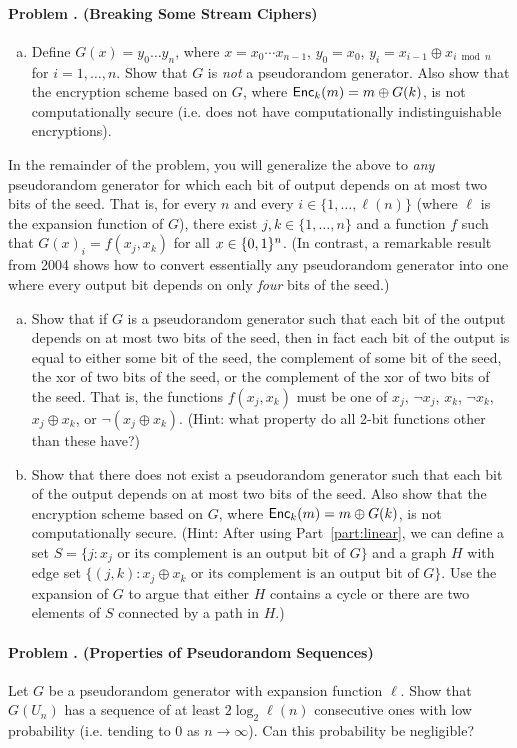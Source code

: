 \documentclass[11pt]{article}
\newcounter{problem}
\newenvironment{problem}[1]{\stepcounter{problem}
\paragraph{Problem \theproblem. #1}}{}
\begin{document}
\begin{problem}{(Breaking Some Stream Ciphers)}

\begin{enumerate}[a)]
\item Define $G(x)=y_0\dots y_{n}$, where $x=x_0\cdots x_{n-1}$, $y_0=x_0$, $y_i = x_{i-1}\oplus
x_{i \bmod n}$ for $i=1,\ldots,n$.  Show that $G$ is {\em not} a
pseudorandom generator. Also show that the encryption scheme based
on $G$, where $\mathsf{Enc}_k(m)=m\oplus G(k)$, is not computationally secure
(i.e. does not have computationally indistinguishable encryptions).
\end{enumerate}

In the remainder of the problem, you will generalize the above to
{\em any} pseudorandom generator for which each bit of output
depends on at most two bits of the seed.  That is, for every $n$ and
every $i\in \{1,\ldots,\ell(n)\}$ (where $\ell$ is the expansion
function of $G$),  there exist $j,k\in \{1,\ldots,n\}$ and a
function $f$ such that $G(x)_i=f(x_j,x_k)$ for all $x\in \{0,1\}^n$.
(In contrast, a remarkable result from 2004 shows how to convert
essentially any pseudorandom generator into one where every output
bit depends on only {\em four} bits of the seed.)

\begin{enumerate}[a)]
\item Show that if $G$ is a pseudorandom generator such that each
bit of the output depends on at most two bits of the seed, then in
fact each bit of the output is equal to either some bit of the seed,
the complement of some bit of the seed, the xor of two bits of the
seed, or the complement of the xor of two bits of the seed.  That
is, the functions $f(x_j,x_k)$ must be one of $x_j$, $\neg x_j$,
$x_k$, $\neg x_k$, $x_j\oplus x_k$, or  $\neg (x_j\oplus x_k)$.
(Hint: what property do all 2-bit functions other than these have?)
\label{part:linear}

\item Show that there does not exist a pseudorandom generator such
that each bit of the output depends on at most two bits of the seed.
Also show that the encryption scheme based on $G$, where
$\mathsf{Enc}_k(m)=m\oplus G(k)$, is not computationally secure.  (Hint: After
using Part~\ref{part:linear}, we can define a set $S=\{j :
\mbox{$x_j$ or its complement is an output bit of $G$}\}$ and a
graph $H$ with edge set $\{(j,k) : \mbox{$x_j\oplus x_k$ or its
complement is an output bit of $G$}\}$.  Use the expansion of $G$ to
argue that either $H$ contains a cycle or there are two elements of
$S$ connected by a path in $H$.)
\end{enumerate}
\end{problem}

\begin{problem}{(Properties of Pseudorandom Sequences)}
Let $G$ be a pseudorandom generator with expansion function
$\ell$.  Show that $G(U_n)$ has a sequence of at least $2\log_2
\ell(n)$ consecutive ones with low probability (i.e. tending to 0
as $n\to \infty$).  Can this probability be negligible?
\end{problem}
\end{document}
